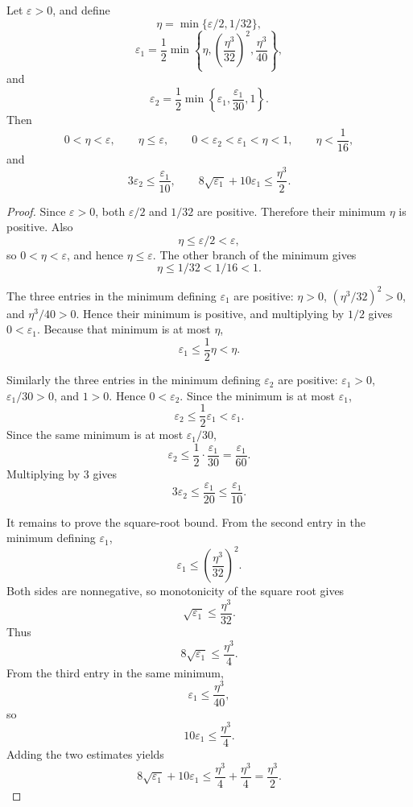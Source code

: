 \begin{lemma}
Let \(\varepsilon>0\), and define
\[
\eta=\min\{\varepsilon/2,1/32\},
\]
\[
\varepsilon_1=
\frac12\min\left\{
\eta,\left(\frac{\eta^3}{32}\right)^2,\frac{\eta^3}{40}
\right\},
\]
and
\[
\varepsilon_2=\frac12\min\left\{\varepsilon_1,\frac{\varepsilon_1}{30},1\right\}.
\]
Then
\[
0<\eta<\varepsilon,\qquad \eta\le\varepsilon,\qquad
0<\varepsilon_2<\varepsilon_1<\eta<1,\qquad \eta<\frac1{16},
\]
and
\[
3\varepsilon_2\le\frac{\varepsilon_1}{10},\qquad
8\sqrt{\varepsilon_1}+10\varepsilon_1\le\frac{\eta^3}{2}.
\]
\end{lemma}
\begin{proof}
Since \(\varepsilon>0\), both \(\varepsilon/2\) and \(1/32\) are positive.
Therefore their minimum \(\eta\) is positive.  Also
\[
\eta\le\varepsilon/2<\varepsilon,
\]
so \(0<\eta<\varepsilon\), and hence \(\eta\le\varepsilon\).  The other branch
of the minimum gives
\[
\eta\le 1/32<1/16<1.
\]

The three entries in the minimum defining \(\varepsilon_1\) are positive:
\(\eta>0\), \((\eta^3/32)^2>0\), and \(\eta^3/40>0\).  Hence their minimum is
positive, and multiplying by \(1/2\) gives \(0<\varepsilon_1\).  Because that
minimum is at most \(\eta\),
\[
\varepsilon_1\le\frac12\eta<\eta.
\]

Similarly the three entries in the minimum defining \(\varepsilon_2\) are
positive: \(\varepsilon_1>0\), \(\varepsilon_1/30>0\), and \(1>0\).  Hence
\(0<\varepsilon_2\).  Since the minimum is at most \(\varepsilon_1\),
\[
\varepsilon_2\le\frac12\varepsilon_1<\varepsilon_1.
\]
Since the same minimum is at most \(\varepsilon_1/30\),
\[
\varepsilon_2\le\frac12\cdot\frac{\varepsilon_1}{30}
=\frac{\varepsilon_1}{60}.
\]
Multiplying by \(3\) gives
\[
3\varepsilon_2\le\frac{\varepsilon_1}{20}\le\frac{\varepsilon_1}{10}.
\]

It remains to prove the square-root bound.  From the second entry in the
minimum defining \(\varepsilon_1\),
\[
\varepsilon_1\le \left(\frac{\eta^3}{32}\right)^2.
\]
Both sides are nonnegative, so monotonicity of the square root gives
\[
\sqrt{\varepsilon_1}\le \frac{\eta^3}{32}.
\]
Thus
\[
8\sqrt{\varepsilon_1}\le \frac{\eta^3}{4}.
\]
From the third entry in the same minimum,
\[
\varepsilon_1\le\frac{\eta^3}{40},
\]
so
\[
10\varepsilon_1\le\frac{\eta^3}{4}.
\]
Adding the two estimates yields
\[
8\sqrt{\varepsilon_1}+10\varepsilon_1
\le \frac{\eta^3}{4}+\frac{\eta^3}{4}
=\frac{\eta^3}{2}.
\]
\end{proof}
